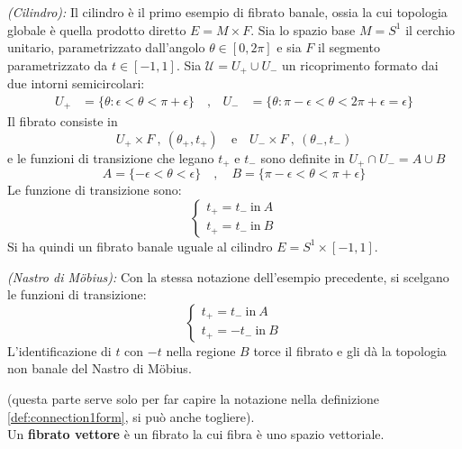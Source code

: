 \begin{example}\emph{(Cilindro): }\label{ex:cilindro}
   Il cilindro è il primo esempio di fibrato banale, ossia la cui topologia globale
   è quella prodotto diretto $E = M\times F$. Sia lo spazio base $M=S^1$ il cerchio
   unitario, parametrizzato dall'angolo $\theta \in [0,2\pi]$ e sia $F$ il segmento
   parametrizzato da $t \in [-1,1]$. Sia $\mathcal{U} = U_+ \cup U_-$ un ricoprimento
   formato dai due intorni semicircolari:
   \begin{equation*}
      \begin{aligned}
         U_+ &= \{\theta : \epsilon < \theta < \pi + \epsilon \} \quad ,&
         U_- &= \{\theta : \pi - \epsilon < \theta < 2\pi + \epsilon = \epsilon \}
      \end{aligned}
   \end{equation*}
   Il fibrato consiste in
      $$ U_+ \times F \: , \: (\theta_+,t_+) \mathrm{\quad e \quad}
         U_- \times F \: , \: (\theta_-,t_-) $$
  e le funzioni di transizione che legano $t_+$ e $t_-$ sono definite in
  $U_+\cap U_- = A \cup B$
  $$ A = \{ -\epsilon < \theta < \epsilon \} \quad , \quad
     B = \{ \pi-\epsilon < \theta < \pi + \epsilon \} $$
  Le funzione di transizione sono:
  $$ \begin{cases}
     t_+= t_- \mathrm{\: in \:} A \\
     t_+= t_- \mathrm{\: in \:} B
  \end{cases}$$
  Si ha quindi un fibrato banale uguale al cilindro $E = S^1 \times [-1,1]$.
\end{example}

\begin{example}\emph{(Nastro di Möbius): }\label{ex:mobius}
   Con la stessa notazione dell'esempio precedente, si scelgano le funzioni di
   transizione:
   $$ \begin{cases}
      t_+= t_- \mathrm{\: in \:} A \\
      t_+= -t_- \mathrm{\: in \:} B
   \end{cases}$$
   L'identificazione di $t$ con $-t$ nella regione $B$ torce il fibrato e gli dà
   la topologia non banale del Nastro di Möbius.
\end{example}

(questa parte serve solo per far capire la notazione nella definizione \ref{def:connection1form},
si può anche togliere).\\

Un \textbf{fibrato vettore} è un fibrato la cui fibra è uno spazio vettoriale.\\


